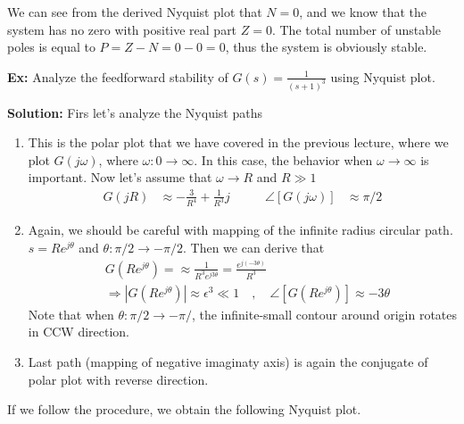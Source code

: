 \documentclass[twoside]{article}
\begin{document}
\vspace{6 pt}

We can see from the derived Nyquist plot that $N=0$, and 
we know that the system has no zero with positive real part 
$Z =0$. The total number of unstable poles is equal to
$P = Z - N = 0 - 0 = 0$, thus the system is obviously stable. 

\textbf{Ex:} Analyze the feedforward stability of $G(s) =
\frac{1}{(s+1)^3}$ using Nyquist plot. 

\textbf{Solution:} Firs let's analyze the Nyquist paths
%
\begin{enumerate}
  \item This is the polar plot that we have covered in the previous
    lecture, where we plot $G(j \omega)$, where $\omega : 0 \to
    \infty$. In this case, the behavior when $\omega \to \infty$ is
    important. Now let's assume that $\omega \to R$ and $R \gg 1$
  \begin{align*}
   G(j R) &\approx -\frac{3}{R^4} + \frac{1}{R^3} j
    \quad & \quad 
    \angle [ G(j \omega) ] &\approx \pi / 2
   \end{align*}
%
  \item Again, we should be careful with mapping of  the infinite radius
    circular path. $s = R e^{j \theta}$ and $\theta : \pi/2 \to -\pi/2$.  Then 
   we can derive that  
   \begin{align*}
     & G \left( R e^{j \theta} \right) = \approx \frac{1}{R^3 e^{j
       3 \theta}} = \frac{e^{j (-3 \theta)}}{R^3}
       \\
    &\Rightarrow | G \left( R e^{j \theta} \right) | \approx
      \epsilon^3 \ll 1
   \quad , \quad \angle [ G \left( R e^{j \theta} \right) ] \approx -3
      \theta
   \end{align*}
   Note that when $\theta : \pi/2 \to -\pi/$, the infinite-small 
   contour around origin rotates in CCW direction. 
   \item Last path (mapping of negative imaginaty axis) is again
   the conjugate of polar plot with reverse direction. 
\end{enumerate}

If we follow the procedure, we obtain the following Nyquist plot. 

\vspace{6 pt}
\end{document}
